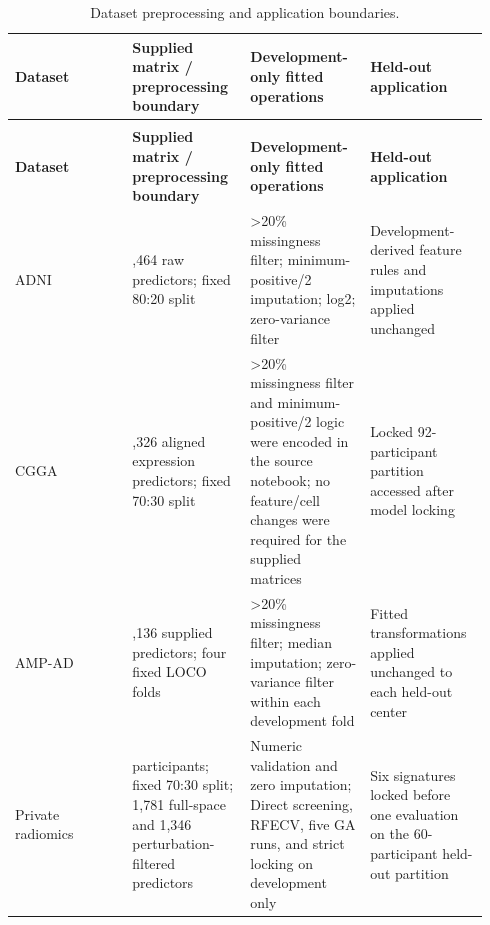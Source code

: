{
\small
\renewcommand{\arraystretch}{1.08}
\setlength{\tabcolsep}{2.2pt}
\begin{longtable}{@{}>{\raggedright\arraybackslash}p{0.2350\linewidth}>{\centering\arraybackslash}p{0.2350\linewidth}>{\centering\arraybackslash}p{0.2350\linewidth}>{\raggedright\arraybackslash}p{0.2350\linewidth}@{}}
\caption{Dataset preprocessing and application boundaries.}\label{tab:supp25}\\
\toprule
\bfseries Dataset & \bfseries Supplied matrix / preprocessing boundary & \bfseries Development-only fitted operations & \bfseries Held-out application \\
\midrule
\endfirsthead
\multicolumn{4}{l}{\footnotesize\itshape \tablename~\thetable\ (continued)}\\
\toprule
\bfseries Dataset & \bfseries Supplied matrix / preprocessing boundary & \bfseries Development-only fitted operations & \bfseries Held-out application \\
\midrule
\endhead
\bottomrule
\endfoot
ADNI & 7,464 raw predictors; fixed 80:20 split & >20\% missingness filter; minimum-positive/2 imputation; log2; zero-variance filter & Development-derived feature rules and imputations applied unchanged \\
CGGA & 24,326 aligned expression predictors; fixed 70:30 split & >20\% missingness filter and minimum-positive/2 logic were encoded in the source notebook; no feature/cell changes were required for the supplied matrices & Locked 92-participant partition accessed after model locking \\
AMP-AD & 13,136 supplied predictors; four fixed LOCO folds & >20\% missingness filter; median imputation; zero-variance filter within each development fold & Fitted transformations applied unchanged to each held-out center \\
Private radiomics & 197 participants; fixed 70:30 split; 1,781 full-space and 1,346 perturbation-filtered predictors & Numeric validation and zero imputation; Direct screening, RFECV, five GA runs, and strict locking on development only & Six signatures locked before one evaluation on the 60-participant held-out partition \\
\end{longtable}
}
